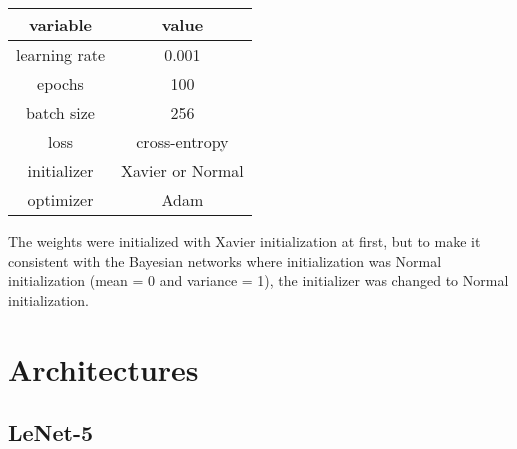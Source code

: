 \begin{table}[H]
    \centering
    \renewcommand{\arraystretch}{2}
    \begin{tabular}[c]{c | c} 
     \hline
     variable & value \\ [0.5ex] 
     \hline
     learning rate &  0.001\\ 
     
     epochs & 100 \\
     
     batch size & 256 \\
     
     loss & cross-entropy \\
     
     initializer & Xavier \cite{glorot2010understanding} or Normal \\
     
     optimizer & Adam \cite{kingma2014adam} \\ [1ex] 
     \hline
    \end{tabular} 
    \renewcommand{\arraystretch}{2}
\end{table}

The weights were initialized with Xavier initialization \cite{glorot2010understanding} at first, but to make it consistent with the Bayesian networks where initialization was Normal initialization (mean = 0 and variance = 1), the initializer was changed to Normal initialization.

\pagebreak

\section*{Architectures}

\subsection{LeNet-5}
 
